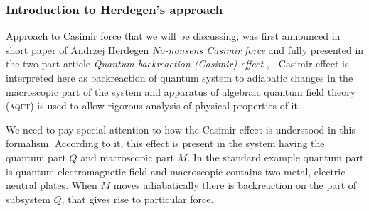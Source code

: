 \documentclass[10pt,t]{beamer}
\begin{document}
\begin{frame}
  \frametitle{Introduction to Herdegen's approach}


  Approach to Casimir force that we will be discussing, was first announced
  in short paper of Andrzej Herdegen \textit{No-nonsens Casimir force}
  \parencite{Herdegen-Nononsens-Casimir-force-Pub-2001} and fully presented
  in the two part article \textit{Quantum backreaction (Casimir) effect}
  \parencite{Herdegen-Quantum-backreaction-ETC-Part-I-Pub-2005},
  \parencite{Herdegen-Quantum-backreaction-ETC-Part-II-Pub-2006}. Casimir
  effect is interpreted here as backreaction of quantum system
  to adiabatic changes in the macroscopic part of the system and apparatus
  of algebraic quantum field theory (\textsc{aqft}) is used to allow
  rigorous analysis of physical properties of it.

  We need to pay special attention to how the Casimir effect is understood
  in this formalism. According to it, this effect is present in the system
  having the quantum part $Q$ and macroscopic part $M$. In the standard
  example quantum part is quantum electromagnetic field and macroscopic
  contains two metal, electric neutral plates. When $M$ moves
  \alert{adiabatically} there is backreaction on the part of subsystem $Q$,
  that gives rise to particular force.

\end{frame}
\end{document}
